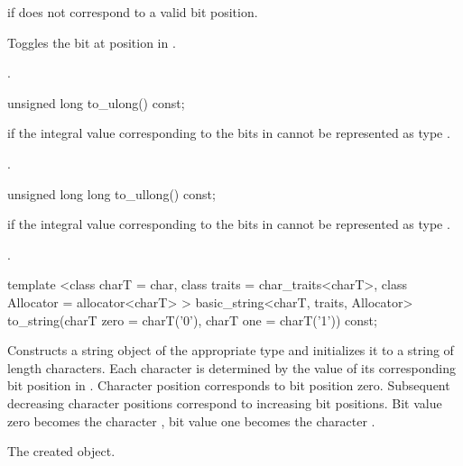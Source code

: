 \begin{itemdescr}
\pnum
\throws
{}
if  does not correspond to a valid bit position.%

\pnum
\effects
Toggles the bit at position  in
.

\pnum
\returns
{}.
\end{itemdescr}

%
\begin{itemdecl}
unsigned long to_ulong() const;
\end{itemdecl}

\begin{itemdescr}
\pnum
\throws
{}%
if the integral value  corresponding to the bits in
cannot be represented as type
.

\pnum
\returns
{}.
\end{itemdescr}

%
\begin{itemdecl}
unsigned long long to_ullong() const;
\end{itemdecl}

\begin{itemdescr}
\pnum
{}%
\throws
{}
if the integral value  corresponding to the bits in
cannot be represented as type
.

\pnum
\returns
{}.
\end{itemdescr}

%
\begin{itemdecl}
template <class charT = char,
    class traits = char_traits<charT>,
    class Allocator = allocator<charT> >
  basic_string<charT, traits, Allocator>
  to_string(charT zero = charT('0'), charT one = charT('1')) const;
\end{itemdecl}

\begin{itemdescr}
\pnum
\effects
Constructs a string object of the appropriate type
and initializes it to a string of length  characters.
Each character is determined by the value of its corresponding bit position in
.
Character position  corresponds to bit position zero.
Subsequent decreasing character positions correspond to increasing bit
positions.
Bit value zero becomes the character ,
bit value one becomes the character
.

\pnum
\returns
The created object.
\end{itemdescr}

